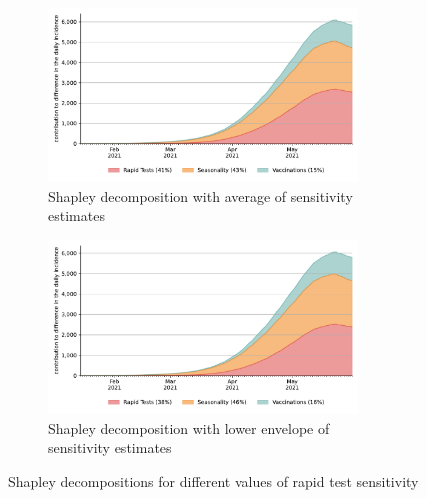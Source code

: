 {\begin{figure}
        \begin{subfigure}[b]{0.475\textwidth}
            \centering
            \includegraphics[width=0.9\textwidth]{figures/results/figures/data/testing/full_decomposition_channels_area_average}
            \caption{Shapley decomposition with average of sensitivity estimates}
        \end{subfigure}
        \begin{subfigure}[b]{0.475\textwidth}
            \centering
            \includegraphics[width=0.9\textwidth]{figures/results/figures/data/testing/full_decomposition_channels_area_lower_envelope}
            \caption{Shapley decomposition with lower envelope of sensitivity estimates}
        \end{subfigure}

        \caption{Shapley decompositions for different values of rapid test sensitivity}
        \label{fig:robustness_to_sensitivity_assumptions}
    \end{figure}

    \FloatBarrier
}
